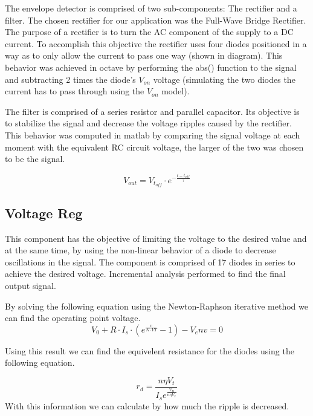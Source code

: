 The envelope detector is comprised of two sub-components: The rectifier and a filter.
The chosen rectifier for our application was the Full-Wave Bridge Rectifier. The purpose of a rectifier is to turn the AC component of the supply to a DC current. To accomplish this objective the rectifier uses four diodes positioned in a way as to only allow the current to pass one way (shown in diagram).
This behavior was achieved in octave by performing the abs() function to the signal and subtracting 2 times the diode’s $V_{on}$ voltage (simulating the two diodes the current has to pass through using the $V_{on}$ model).

The filter is comprised of a series resistor and parallel capacitor. Its objective is to stabilize the signal and decrease the voltage ripples caused by the rectifier. This behavior was computed in matlab by comparing the signal voltage at each moment with the equivalent RC circuit voltage, the larger of the two was chosen to be the signal.

\[
V_{out}=V_{t_{off}}\cdot{}e^{-\frac{t-t_{off}}{\tau}}
\]


\subsection{Voltage Reg}
\label{subsec:voltreg}

This component has the objective of limiting the voltage to the desired value and at the same time, by using the non-linear behavior of a diode to decrease oscillations in the signal.
The component is comprised of 17 diodes in series to achieve the desired voltage.
Incremental analysis performed to find the final output signal.

By solving the following equation using the Newton-Raphson iterative method we can find the operating point voltage.
\[
V_0 + R\cdot I_s \cdot (e^{\frac{v}{N\cdot VT}}-1)-V_env = 0
\]

Using this result we can find the equivelent resistance for the diodes using the following equation.

\[
r_d=\frac{n\eta V_t}{I_se^{\frac{V_D}{n\eta V_x}}}
\]
With this information we can calculate by how much the ripple is decreased.

